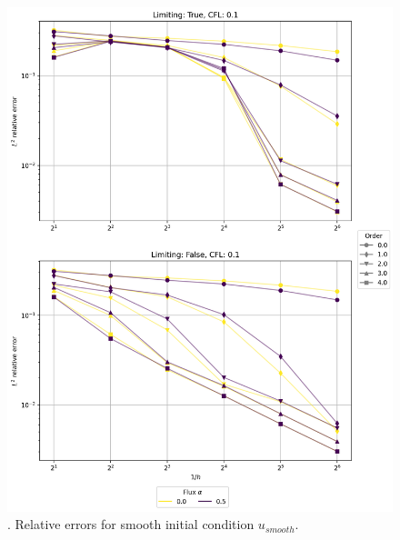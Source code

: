 \begin{figure}[p!]
	\centering
	\includegraphics[width=1.1\textwidth]{../figs/parametric/advection_1D/advection_1D_smooth_reduced.png}
	\caption{. Relative errors for smooth initial condition
		$u_{smooth}$.}
	\label{fig:adv_conv_1D}
\end{figure}



